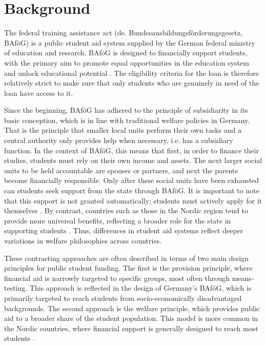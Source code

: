 
\section{Background}
\label{section:theoretical_empirical_context}

The federal training assistance act (de. Bundesausbildungsförderungsgesetz, BAföG) is a public student aid system supplied by the German federal ministry of education and research. BAföG is designed to financially support students, with the primary aim to promote equal opportunities in the education system and unlock educational potential \citep{meier_bafog_2024}. The eligibility criteria for the loan is therefore relatively strict to make sure that only students who are genuinely in need of the loan have access to it.

Since the beginning, BAföG has adhered to the principle of subsidiarity in its basic conception, which is in line with traditional welfare policies in Germany. That is the principle that smaller local units perform their own tasks and a central authority only provides help when necessary, i.e. has a subsidiary function. In the context of BAföG, this means that first, in order to finance their studies, students must rely on their own income and assets. The next larger social units to be held accountable are spouses or partners, and next the parents become financially responsible. Only after these social units have been exhausted can students seek support from the state through BAföG. It is important to note that this support is not granted automatically; students must actively apply for it themselves \citep{staack_von_2017}. By contrast, countries such as those in the Nordic region tend to provide more universal benefits, reflecting a broader role for the state in supporting students \citep{gwosc_krisenbewaltigung_2022, schwarz_study_2004}. Thus, differences in student aid systems reflect deeper variations in welfare philosophies across countries.

These contrasting approaches are often described in terms of two main design principles for public student funding. The first is the provision principle, where financial aid is narrowly targeted to specific groups, most often through means-testing. This approach is reflected in the design of Germany’s BAföG, which is primarily targeted to reach students from socio-economically disadvantaged backgrounds. The second approach is the welfare principle, which provides public aid to a broader share of the student population. This model is more common in the Nordic countries, where financial support is generally designed to reach most students \citep{gwosc_krisenbewaltigung_2022, oecd_education_2024}.

